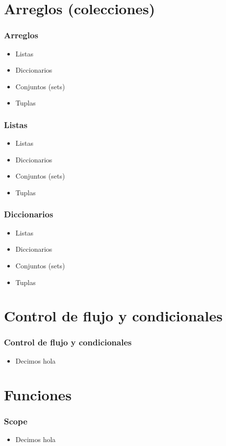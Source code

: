 \documentclass[hyperref={pdfpagelabels=false},xcolor=pst,pdf,fragile]{beamer}
\begin{document}
\section{Arreglos (colecciones)}
\begin{frame}
    \frametitle{Arreglos}
    \pause
    \begin{itemize}
    \item Listas
    \item Diccionarios
    \item Conjuntos (sets)
    \item Tuplas
    \end{itemize}
\end{frame}

\begin{frame}
    \frametitle{Listas}
    \pause
    \begin{itemize}
    \item Listas
    \item Diccionarios
    \item Conjuntos (sets)
    \item Tuplas
    \end{itemize}
\end{frame}

\begin{frame}
    \frametitle{Diccionarios}
    \pause
    \begin{itemize}
    \item Listas
    \item Diccionarios
    \item Conjuntos (sets)
    \item Tuplas
    \end{itemize}
\end{frame}

\section{Control de flujo y condicionales}
\begin{frame}
    \frametitle{Control de flujo y condicionales}
    \pause
    \begin{itemize}
    \item Decimos hola
    \end{itemize}
\end{frame}

\section{Funciones}
\begin{frame}
    \frametitle{Scope}
    \pause
    \begin{itemize}
    \item Decimos hola
    \end{itemize}
\end{frame}
\end{document}
